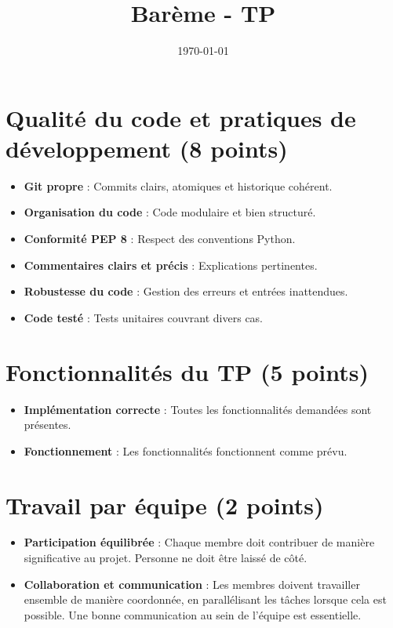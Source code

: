 \documentclass[a4paper,12pt]{article}
\title{Barème - TP}
\author{}
\date{\today}
\begin{document}
\makeonlytitle



\section*{Qualité du code et pratiques de développement (8 points)}
\begin{itemize}
    \item \textbf{Git propre} : Commits clairs, atomiques et historique cohérent.
    \item \textbf{Organisation du code} : Code modulaire et bien structuré.
    \item \textbf{Conformité PEP 8} : Respect des conventions Python.
    \item \textbf{Commentaires clairs et précis} : Explications pertinentes.
    \item \textbf{Robustesse du code} : Gestion des erreurs et entrées inattendues.
    \item \textbf{Code testé} : Tests unitaires couvrant divers cas.
\end{itemize}

\section*{Fonctionnalités du TP (5 points)}
\begin{itemize}
    \item \textbf{Implémentation correcte} : Toutes les fonctionnalités demandées sont présentes.
    \item \textbf{Fonctionnement} : Les fonctionnalités fonctionnent comme prévu.
\end{itemize}

\section*{Travail par équipe (2 points)}
\begin{itemize}
    \item \textbf{Participation équilibrée} : Chaque membre doit contribuer de manière significative au projet. Personne ne doit être laissé de côté.
    \item \textbf{Collaboration et communication} : Les membres doivent travailler ensemble de manière coordonnée, en parallélisant les tâches lorsque cela est possible. Une bonne communication au sein de l'équipe est essentielle.
\end{itemize}
\end{document}
